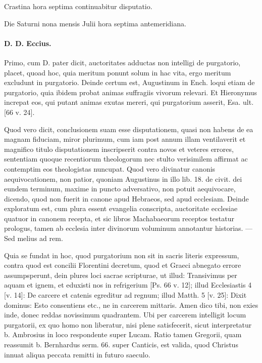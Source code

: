 Crastina hora septima continuabitur disputatio.

Die Saturni nona mensis Julii hora septima antemeridiana.

\paragraph*{D. D. Eccius.}

Primo, cum D. pater dicit, auctoritates adductas non intelligi de purgatorio, placet, quoad hoc, quia meritum ponunt solum in hac vita, ergo meritum \marginpar{\small[326]} excludunt in purgatorio. Deinde certum est, Augustinum in Ench. loqui etiam de purgatorio, quia ibidem probat animas suffragiis vivorum relevari. Et Hieronymus increpat eos, qui putant animas exutas mereri, qui purgatorium asserit, Esa. ult. [66 v. 24].

Quod vero dicit, conclusionem suam esse disputationem, quasi non habens de ea magnam fiduciam, miror plurimum, cum iam post annum illam ventilaverit et magnifico titulo disputationem inscripserit contra novos et veteres errores, sententiam quoque recentiorum theologorum nec stulto verisimilem affirmat ac contemptim eos theologistas nuncupat. Quod vero divinatur canonis aequivocationem, non patior, quoniam Augustinus in illo lib. 18. de civit. dei eundem terminum, maxime in puncto adversativo, non potuit aequivocare, dicendo, quod non fuerit in canone apud Hebraeos, sed apud ecclesiam. Deinde exploratum est, cum plura essent evangelia conscripta, auctoritate ecclesiae quatuor in canonem recepta, et sic libros Machabaeorum receptos testatur prologus, tamen ab ecclesia inter divinorum voluminum annotantur historias. — Sed melius ad rem.

Quia se fundat in hoc, quod purgatorium non sit in sacris literis expressum, contra quod est concilii Florentini decretum, quod et Graeci abnegato errore assumpsperunt, dein plures loci sacrae scripturae, ut illud: Transivimus per aquam et ignem, et eduxisti nos in refrigerium [Ps. 66 v. 12]; illud Ecclesiastis 4 [v. 14]: De carcere et catenis egreditur ad regnum; illud Matth. 5 [v. 25]: Dixit dominus: Esto consentiens etc., ne in carcerem mittaris. Amen dico tibi, non exies inde, donec reddas novissimum quadrantem. Ubi per carcerem intelligit locum purgatorii, ex quo homo non liberatur, nisi plene satisfecerit, sicut interpretatur b. Ambrosius in loco respondente super Lucam. Ratio tamen Gregorii, quam reassumit b. Bernhardus serm. 66. super Canticis, est valida, quod Christus innuat aliqua peccata remitti in futuro saeculo.

